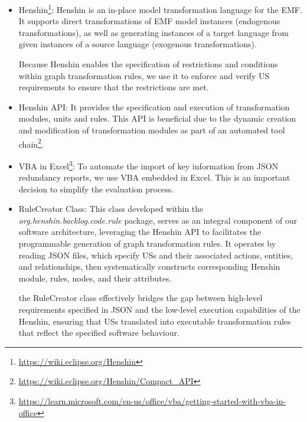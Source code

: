 \begin{itemize}
	\item Henshin\footnote{\href{https://wiki.eclipse.org/Henshin}{https://wiki.eclipse.org/Henshin}}: Henshin is an in-place model transformation language for the EMF. It supports direct transformations of EMF model instances (endogenous transformations), as well as generating instances of a target language from given instances of a source language (exogenous transformations).
	
	Because Henshin enables the specification of restrictions and conditions within graph transformation rules, we use it to enforce and verify US requirements to ensure that the restrictions are met.
		
	\item Henshin API: It provides the specification and execution of transformation modules, units and rules. This API is beneficial due to the dynamic creation and modification of transformation modules as part of an automated tool chain\footnote{\href{https://wiki.eclipse.org/Henshin/Compact\_API}{https://wiki.eclipse.org/Henshin/Compact\_API}}.
	
	\item VBA in Excel\footnote{\href{https://learn.microsoft.com/en-us/office/vba/library-reference/concepts/getting-started-with-vba-in-office}{https://learn.microsoft.com/en-us/office/vba/getting-started-with-vba-in-office}}: To automate the import of key information from JSON redundancy reports, we use VBA embedded in Excel. This is an important decision to simplify the evaluation process.
	
	\item RuleCreator Class: This class developed within the \textit{org.henshin.backlog.code.rule} package, serves as an integral component of our software architecture, leveraging the Henshin API to facilitates the programmable generation of graph transformation rules. It operates by reading JSON files, which specify USs and their associated actions, entities, and relationships, then systematically constructs corresponding Henshin module, rules, nodes, and their attributes.
	
	the RuleCreator class effectively bridges the gap between high-level requirements specified in JSON and the low-level execution capabilities of the Henshin, ensuring that USs translated into executable transformation rules that reflect the specified software behaviour. %
	

\end{itemize}
